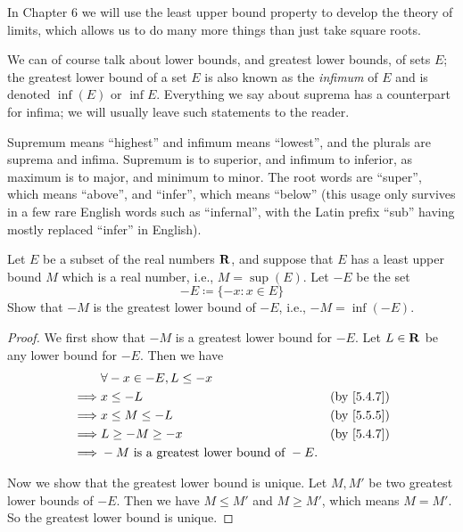 \begin{remark}\label{5.5.14}
  In Chapter 6 we will use the least upper bound property to develop the theory of limits, which allows us to do many more things than just take square roots.
\end{remark}

\begin{remark}\label{5.5.15}
  We can of course talk about lower bounds, and greatest lower bounds, of sets \(E\);
  the greatest lower bound of a set \(E\) is also known as the \emph{infimum} of \(E\) and is denoted \(\inf(E)\) or \(\inf E\).
  Everything we say about suprema has a counterpart for infima;
  we will usually leave such statements to the reader.
\end{remark}

\begin{note}
  Supremum means ``highest'' and infimum means ``lowest'', and the plurals are suprema and infima.
  Supremum is to superior, and infimum to inferior, as maximum is to major, and minimum to minor.
  The root words are ``super'', which means ``above'', and ``infer'', which means ``below''
  (this usage only survives in a few rare English words such as ``infernal'', with the Latin prefix ``sub'' having mostly replaced ``infer'' in English).
\end{note}

\exercisesection

\begin{exercise}\label{ex 5.5.1}
  Let \(E\) be a subset of the real numbers \(\mathbf{R}\), and suppose that \(E\) has a least upper bound \(M\) which is a real number, i.e., \(M = \sup(E)\).
  Let \(-E\) be the set
  \[
    -E \coloneqq \{-x : x \in E\}
  \]
  Show that \(-M\) is the greatest lower bound of \(-E\), i.e., \(-M = \inf(-E)\).
\end{exercise}

\begin{proof}
  We first show that \(-M\) is a greatest lower bound for \(-E\).
  Let \(L \in \mathbf{R}\) be any lower bound for \(-E\).
  Then we have
  \begin{align*}
             & \forall -x \in -E, L \leq -x                                            \\
    \implies & x \leq -L                                    & \text{(by \cref{5.4.7})} \\
    \implies & x \leq M \leq -L                             & \text{(by \cref{5.5.5})} \\
    \implies & L \geq -M \geq -x                            & \text{(by \cref{5.4.7})} \\
    \implies & -M \text{ is a greatest lower bound of } -E.
  \end{align*}

  Now we show that the greatest lower bound is unique.
  Let \(M, M'\) be two greatest lower bounds of \(-E\).
  Then we have \(M \leq M'\) and \(M \geq M'\), which means \(M = M'\).
  So the greatest lower bound is unique.
\end{proof}


